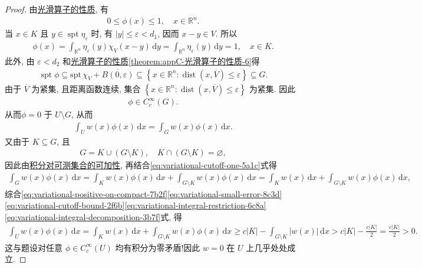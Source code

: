 \documentclass[../../main.tex]{subfiles}
\begin{document}
\begin{proof}
由\hyperref[theorem:appC-光滑算子的性质]{光滑算子的性质}, 有
\begin{align}
0\leqslant\phi(x)\leqslant 1,
\quad x\in\mathbb{R}^n.
\label{eq:variational-cutoff-bound-2f6b}
\end{align}
当 $x\in K$ 且 $y\in\operatorname{spt}\eta_\varepsilon$ 时, 有 $|y|\leqslant\varepsilon<d_1$, 因而 $x-y\in V$. 所以
\begin{align}
\phi(x)
=
\int_{\mathbb{R}^n}
\eta_\varepsilon(y)\chi_V(x-y)\,\mathrm{d}y=
\int_{\mathbb{R}^n}\eta_\varepsilon(y)\,\mathrm{d}y=1,
\quad x\in K.\label{eq:variational-cutoff-one-5a1c}
\end{align}
此外, 由 $\varepsilon<d_2$ 和\hyperref[theorem:appC-光滑算子的性质]{光滑算子的性质\ref{theorem:appC-光滑算子的性质-6}}得
\begin{align*}
\operatorname{spt}\phi\subseteq \mathrm{spt}\,\chi _V+\overline{B\left( 0,\varepsilon \right) }
\subseteq
\left\{
x\in\mathbb{R}^n:
\operatorname{dist}(x,\overline{V})\leqslant\varepsilon
\right\}\subseteq G.
\end{align*}
由于 $\overline{V}$ 为紧集, 且距离函数连续, 集合
$\left\{
x\in\mathbb{R}^n:
\operatorname{dist}(x,\overline{V})\leqslant\varepsilon
\right\}$
为紧集. 因此
\begin{align}
\phi\in C_c^\infty(G).
\label{eq:variational-cutoff-support-9d4e}
\end{align}
从而$\phi=0$ 于 $U\setminus G$, 从而
\begin{align}
\int_U w(x)\phi(x)\,\mathrm{d}x
=
\int_G w(x)\phi(x)\,\mathrm{d}x.
\label{eq:variational-integral-restriction-6c8a}
\end{align}
又由于 $K\subseteq G$, 且
\begin{align*}
G=K\cup(G\setminus K),
\quad K\cap(G\setminus K)=\varnothing,
\end{align*}
因此由\hyperref[Real Analysis-theorem:积分对定义域的可数可加性]{积分对可测集合的可加性}, 再结合\eqref{eq:variational-cutoff-one-5a1c}式得
\begin{align}
\int_G w(x)\phi(x)\,\mathrm{d}x
=
\int_K w(x)\phi(x)\,\mathrm{d}x
+\int_{G\setminus K}w(x)\phi(x)\,\mathrm{d}x
=
\int_K w(x)\,\mathrm{d}x
+\int_{G\setminus K}w(x)\phi(x)\,\mathrm{d}x,
\label{eq:variational-integral-decomposition-3b7f}
\end{align}
综合\eqref{eq:variational-positive-on-compact-7b2f}\eqref{eq:variational-small-error-8c3d}\eqref{eq:variational-cutoff-bound-2f6b}\eqref{eq:variational-integral-restriction-6c8a}\eqref{eq:variational-integral-decomposition-3b7f}式, 得
\begin{align*}
\int_U w(x)\phi(x)\,\mathrm{d}x
=
\int_K w(x)\,\mathrm{d}x
+\int_{G\setminus K}w(x)\phi(x)\,\mathrm{d}x
\geqslant
c|K|-\int_{G\setminus K}|w(x)|\,\mathrm{d}x
>
c|K|-\frac{c|K|}{2}
=\frac{c|K|}{2}>0.
\end{align*}
这与题设对任意 $\phi\in C_c^\infty(U)$ 均有积分为零矛盾!因此 $w=0$ 在 $U$ 上几乎处处成立.
\end{proof}
\end{document}
